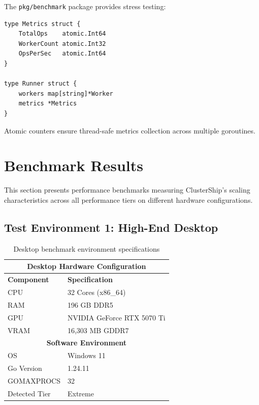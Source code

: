 \documentclass[11pt]{article}
\begin{document}
The \texttt{pkg/benchmark} package provides stress testing:

\begin{lstlisting}
type Metrics struct {
    TotalOps    atomic.Int64
    WorkerCount atomic.Int32
    OpsPerSec   atomic.Int64
}

type Runner struct {
    workers map[string]*Worker
    metrics *Metrics
}
\end{lstlisting}

Atomic counters ensure thread-safe metrics collection across multiple goroutines.


\section{Benchmark Results}

This section presents performance benchmarks measuring ClusterShip's scaling characteristics across all performance tiers on different hardware configurations.

\subsection{Test Environment 1: High-End Desktop}

\begin{table}[H]
\centering
\renewcommand{\arraystretch}{1.3}
\begin{tabular}{|l|l|}
\hline
\multicolumn{2}{|c|}{\textbf{Desktop Hardware Configuration}} \\
\hline
\textbf{Component} & \textbf{Specification} \\
\hline
CPU & 32 Cores (x86\_64) \\
RAM & 196 GB DDR5 \\
GPU & NVIDIA GeForce RTX 5070 Ti \\
VRAM & 16,303 MB GDDR7 \\
\hline
\multicolumn{2}{|c|}{\textbf{Software Environment}} \\
\hline
OS & Windows 11 \\
Go Version & 1.24.11 \\
GOMAXPROCS & 32 \\
Detected Tier & Extreme \\
\hline
\end{tabular}
\caption{Desktop benchmark environment specifications}
\label{tab:testenv-desktop}
\end{table}
\end{document}
